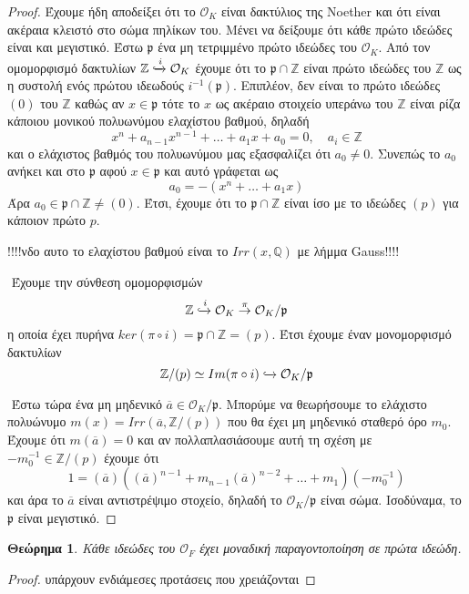 \documentclass[oneside,a4paper]{article}
\newtheorem{theorem}{Θεώρημα}
\newcommand {\tl}{\textlatin}
\newcommand{\Z}{\mathbb{Z}}
\newcommand{\Q}{\mathbb{Q}}
\begin{document}
\begin{proof}
	Έχουμε ήδη αποδείξει ότι το $\mathcal{O}_K$ είναι δακτύλιος της \tl{Noether} και ότι είναι ακέραια κλειστό στο σώμα πηλίκων του. Μένει να δείξουμε ότι κάθε πρώτο ιδεώδες είναι και μεγιστικό. Έστω $\mathfrak{p}$ ένα μη τετριμμένο πρώτο ιδεώδες του $\mathcal{O}_K$. Από τον ομομορφισμό δακτυλίων $\Z \xhookrightarrow{i} \mathcal{O}_K$ έχουμε ότι το $\mathfrak{p} \cap \Z$ είναι πρώτο ιδεώδες του $\Z$ ως η συστολή ενός πρώτου ιδεωδούς $i^{-1}(\mathfrak{p})$. Επιπλέον, δεν είναι το πρώτο ιδεώδες $(0)$ του $\Z$ καθώς αν $x \in \mathfrak{p}$ τότε το $x$ ως ακέραιο στοιχείο υπεράνω του $\Z$ είναι ρίζα κάποιου μονικού πολυωνύμου ελαχίστου βαθμού, δηλαδή 
	$$x^n + a_{n-1}x^{n-1} + \ldots + a_1 x + a_0 = 0, \quad a_i \in \Z$$ και ο ελάχιστος βαθμός του πολυωνύμου μας εξασφαλίζει ότι $a_0 \neq 0$. Συνεπώς το $a_0$ ανήκει και στο $\mathfrak{p}$ αφού $x \in \mathfrak{p}$ και αυτό γράφεται ως
	$$a_0 = - (x^n + \ldots + a_1 x)$$ Άρα $a_0 \in \mathfrak{p}\cap \Z \neq (0)$. Έτσι, έχουμε ότι το $\mathfrak{p}\cap \Z$ είναι ίσο με το ιδεώδες $(p)$ για κάποιον πρώτο $p$.


	!!!!νδο αυτο το ελαχίστου βαθμού είναι το $Irr(x,\Q)$ με λήμμα \tl{Gauss}!!!!
	
	$ $\newline
	Έχουμε την σύνθεση ομομορφισμών $$\Z \xhookrightarrow{i} \mathcal{O}_K \overset{\pi}{\rightarrow} \mathcal{O}_K / \mathfrak{p}$$ η οποία έχει πυρήνα $ker(\pi \circ i) = \mathfrak{p} \cap \Z = (p)$. Έτσι έχουμε έναν μονομορφισμό δακτυλίων $$\Z / (p) \simeq Im(\pi \circ i ) \xhookrightarrow{} \mathcal{O}_K/\mathfrak{p}$$
	
	$ $\newline
	Έστω τώρα ένα μη μηδενικό $\overline{a} \in \mathcal{O}_K/\mathfrak{p}$. Μπορύμε να θεωρήσουμε το ελάχιστο πολυώνυμο $m(x) = Irr(\overline{a},\Z/(p))$ που θα έχει μη μηδενικό σταθερό όρο $m_0$. Έχουμε ότι $m(\overline{a}) = 0$ και αν πολλαπλασιάσουμε αυτή τη σχέση με $- m^{-1}_0 \in \Z/(p)$ έχουμε ότι $$1 = (\overline{a})\left((\overline{a})^{n-1} + m_{n-1}(\overline{a})^{n-2} + \ldots + m_1\right)(-m^{-1}_0)$$ και άρα το $\overline{a}$ είναι αντιστρέψιμο στοχείο, δηλαδή το $\mathcal{O}_K/\mathfrak{p}$ είναι σώμα. Ισοδύναμα, το $\mathfrak{p}$ είναι μεγιστικό. 
\end{proof}

\begin{theorem}Κάθε ιδεώδες του $\mathcal{O}_F$ έχει μοναδική παραγοντοποίηση σε πρώτα ιδεώδη.
\end{theorem}
\begin{proof}
	υπάρχουν ενδιάμεσες προτάσεις που χρειάζονται
\end{proof}
\end{document}
